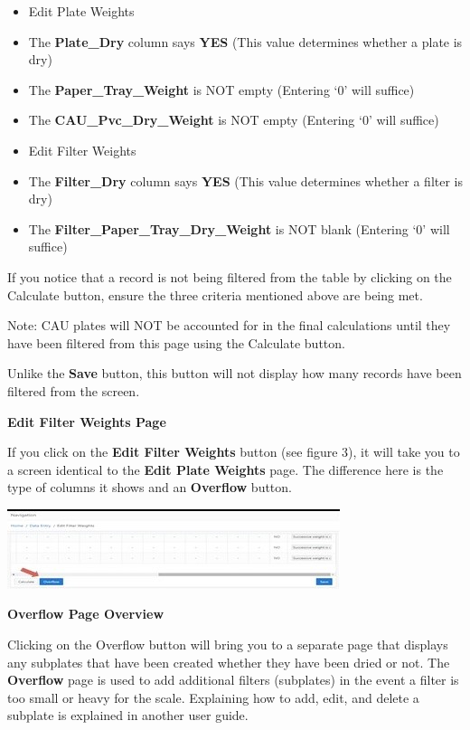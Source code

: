 \documentclass[]{book}
\begin{document}
\begin{itemize}
\item
  Edit Plate Weights\\
\item
  The \textbf{Plate\_Dry} column says \textbf{YES} (This value determines whether a plate is dry)\\
\item
  The \textbf{Paper\_Tray\_Weight} is NOT empty (Entering `0' will suffice)\\
\item
  The \textbf{CAU\_Pvc\_Dry\_Weight} is NOT empty (Entering `0' will suffice)
\item
  Edit Filter Weights\\
\item
  The \textbf{Filter\_Dry} column says \textbf{YES} (This value determines whether a filter is dry)\\
\item
  The \textbf{Filter\_Paper\_Tray\_Dry\_Weight} is NOT blank (Entering `0' will suffice)
\end{itemize}

If you notice that a record is not being filtered from the table by clicking on the Calculate button, ensure the three criteria mentioned above are being met.

Note: CAU plates will NOT be accounted for in the final calculations until they have been filtered from this page using the Calculate button.

Unlike the \textbf{Save} button, this button will not display how many records have been filtered from the screen.

\textbf{Edit Filter Weights Page}

If you click on the \textbf{Edit Filter Weights} button (see figure 3), it will take you to a screen identical to the \textbf{Edit Plate Weights} page. The difference here is the type of columns it shows and an \textbf{Overflow} button.

\includegraphics{images/Data5.jpg}

\textbf{Overflow Page Overview}

Clicking on the Overflow button will bring you to a separate page that displays any subplates that have been created whether they have been dried or not. The \textbf{Overflow} page is used to add additional filters (subplates) in the event a filter is too small or heavy for the scale. Explaining how to add, edit, and delete a subplate is explained in another user guide.
\end{document}
